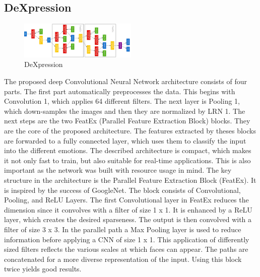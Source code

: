 \documentclass[11pt]{article}
\begin{document}
	\subsection{DeXpression \cite{burkert2015dexpression}}
	\begin{figure}[ht]
		\centering
		\includegraphics[width=0.5\textwidth]{deXpression_arch}
		\caption{DeXpression}
	\end{figure}
The proposed deep Convolutional Neural Network architecture consists of four parts.
The first part automatically preprocesses the data. This
begins with Convolution 1, which applies 64 different
filters. The next layer is Pooling 1, which down-samples
the images and then they are normalized by LRN 1. The
next steps are the two FeatEx (Parallel Feature Extraction
Block) blocks. They are the core of the proposed architecture. The features extracted by theses blocks are
forwarded to a fully connected layer, which uses them
to classify the input into the different emotions.
The described architecture is compact, which makes it
not only fast to train, but also suitable for real-time
applications. This is also important as the network was
built with resource usage in mind. \newline The key structure in the architecture is the
Parallel Feature Extraction Block (FeatEx). It is inspired
by the success of GoogleNet. The block consists of
Convolutional, Pooling, and ReLU Layers. The first
Convolutional layer in FeatEx reduces the dimension
since it convolves with a filter of size 1 x 1. It is
enhanced by a ReLU layer, which creates the desired
sparseness. The output is then convolved with a filter
of size 3 x 3. In the parallel path a Max Pooling layer
is used to reduce information before applying a CNN
of size 1 x 1. This application of differently sized filters
reflects the various scales at which faces can appear.
The paths are concatenated for a more diverse
representation of the input. Using this block twice
yields good results.
	
	\newpage
\end{document}
